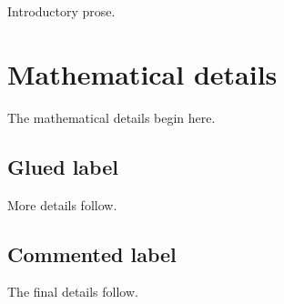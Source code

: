Introductory prose.

\section{Mathematical details}
\label{sec:math-details}
\label{sec:math-details-alias}

The mathematical details begin here.

\subsection{Glued label}
\label{sec:glued-label}

More details follow.

\subsection{Commented label}
\label{sec:commented-label}

The final details follow.
